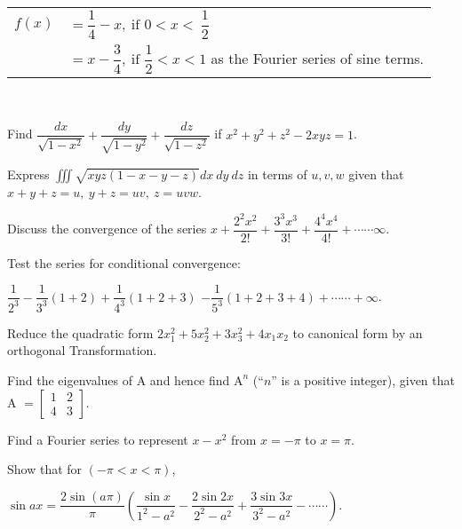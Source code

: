 \begin{tabular}{l l}
  $f(x)$  & $ = \dfrac{1}{4} - x,\ \text{if } 0 < x <\ \dfrac{1}{2}$\\
        &$ = x - \dfrac{3}{4},\ \text{
      if } \dfrac{1}{2} < x < 1$ as the Fourier series of sine terms.
      \end{tabular}\\

\markB
\partCo

\item 
\iitem Find $\dfrac{dx}{\sqrt{1-x^2}} + \dfrac{dy}{\sqrt{1-y^2}} + \dfrac{dz}{\sqrt{1-z^2}}$ 
  if $ x^2 + y^2 + z^2 - 2xyz = 1 $.
\Or

\item Express $\iiint \sqrt{xyz(1-x-y-z)} dx\ dy\ dz $ in terms of $u, v, w$ 
  given that\\      $x + y + z = u,\ y + z = uv,\ z = uvw$.\\
\ene

\item
\iitem Discuss the convergence of the series $x + \dfrac{2^2x^2}{2!} + \dfrac{3^3x^3}{3!} + \dfrac{4^4x^4}{4!} +
  \cdots \cdots \infty$.
\Or
\item Test the series for conditional convergence:

  $\dfrac{1}{2^3} - \dfrac{1}{3^3}(1+2)+\dfrac{1}{4^3}(1+2+3)$
  $ -\dfrac{1}{5^3}(1+2+3+4) + \cdots \cdots + \infty$.\\
\ene

\item 
\iitem Reduce the quadratic form $2x^2_1 + 5x^2_2 + 3x^2_3 + 4x_1x_2$ to canonical form by an 
  orthogonal Transformation.
\Or
\item Find the eigenvalues of A and hence find $\text{A}^n$ (``$n$'' is a positive integer),
  given that \\A $= \begin{bmatrix}
  1 & 2\\
  4 & 3
  \end{bmatrix}$.
\ene

\newpage 

\item
\iitem Find a Fourier series to represent $x - x^2$ from $ x = -\pi$ to $x = \pi$.
\Or
\item Show that for $(-\pi < x < \pi)$,

  \hspace{2cm} $\sin ax = \dfrac{2 \sin (a\pi)}{\pi} \left( \dfrac{\sin x}{1^2-a^2}
   -  \dfrac{2\sin 2x}{2^2-a^2} + \dfrac{3\sin 3x}{3^2-a^2} - \cdots \cdots \right)$.
\ene

